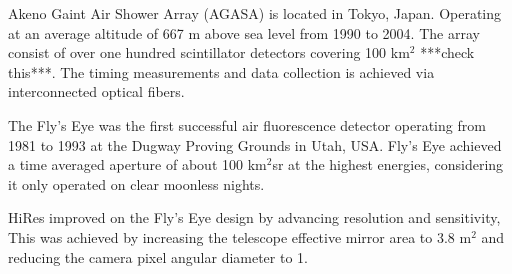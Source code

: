 Akeno Gaint Air Shower Array (AGASA) is located in Tokyo, Japan. Operating at an average altitude of 667 m above sea level from 1990 to 2004. The array consist of over one hundred scintillator detectors covering 100 km$^2$ ***check this***. The timing measurements and data collection is achieved via interconnected optical fibers.

The Fly's Eye was the first successful air fluorescence detector operating from 1981 to 1993 at the Dugway Proving Grounds in Utah, USA. Fly's Eye achieved a time averaged aperture of about 100 km$^2$sr at the highest energies, considering it only operated on clear moonless nights. 

HiRes improved on the Fly's Eye design by advancing resolution and sensitivity, This was achieved by increasing the telescope effective mirror area to 3.8 m$^2$ and reducing the camera pixel angular diameter to 1\textdegree.